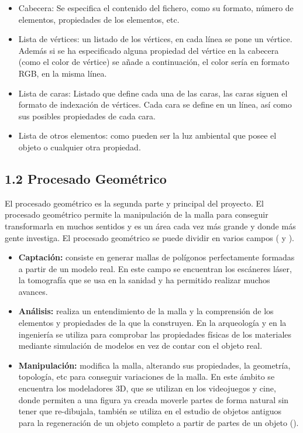 \begin{itemize}[label={--}]
	\item Cabecera: Se especifica el contenido del fichero, como su formato, número de elementos, propiedades de los elementos, etc.
	\item Lista de vértices: un listado de los vértices, en cada línea se pone un vértice. Además si se ha especificado alguna propiedad del vértice en la cabecera (como el color de vértice) se añade a continuación, el color sería en formato RGB, en la misma línea.
	\item Lista de caras: Listado que define cada una de las caras, las caras siguen el formato de indexación de vértices. Cada cara se define en un línea, así como sus posibles propiedades de cada cara.
	\item Lista de otros elementos: como pueden ser la luz ambiental que posee el objeto o cualquier otra propiedad. 
\end{itemize}

\subsection*{1.2 Procesado Geométrico}
El procesado geométrico es la segunda parte y principal del proyecto. El procesado geométrico permite la manipulación de la malla para conseguir transformarla en muchos sentidos y es un área cada vez más grande y donde más gente investiga. El procesado geométrico se puede dividir en varios campos (\cite{CS468GeometryProcessing} y \cite{GeometryProcessingCourse}).

\begin{itemize}
	\item \textbf{Captación:} consiste en generar mallas de polígonos perfectamente formadas a partir de un modelo real. En este campo se encuentran los escáneres láser, la tomografía que se usa en la sanidad y ha permitido realizar muchos avances.
	\item \textbf{Análisis:} realiza un entendimiento de la malla y la comprensión de los elementos y propiedades de la que la construyen. En la arqueología y en la ingeniería se utiliza para comprobar las propiedades físicas de los materiales mediante simulación de modelos en vez de contar con el objeto real.
	\item \textbf{Manipulación:} modifica la malla, alterando sus propiedades, la geometría, topología, etc para conseguir variaciones de la malla. En este ámbito se encuentra los modeladores 3D, que se utilizan en los videojuegos y cine, donde permiten a una figura ya creada moverle partes de forma natural sin tener que re-dibujala, también se utiliza en el estudio de objetos antiguos para la regeneración de un objeto completo a partir de partes de un objeto (\cite{meleroInteractive3DReconstruction2003}).
	
\end{itemize}

